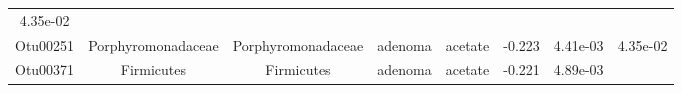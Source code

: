 \documentclass[11pt,]{article}
\begin{document}
\begin{longtable}[]{@{}cccccccc@{}}
\begin{minipage}[t]{0.08\columnwidth}
4.35e-02\strut
\end{minipage}\tabularnewline
\begin{minipage}[t]{0.08\columnwidth}\centering\strut
Otu00251\strut
\end{minipage} & \begin{minipage}[t]{0.15\columnwidth}\centering\strut
Porphyromonadaceae\strut
\end{minipage} & \begin{minipage}[t]{0.15\columnwidth}\centering\strut
Porphyromonadaceae\strut
\end{minipage} & \begin{minipage}[t]{0.08\columnwidth}\centering\strut
adenoma\strut
\end{minipage} & \begin{minipage}[t]{0.09\columnwidth}\centering\strut
acetate\strut
\end{minipage} & \begin{minipage}[t]{0.07\columnwidth}\centering\strut
-0.223\strut
\end{minipage} & \begin{minipage}[t]{0.08\columnwidth}\centering\strut
4.41e-03\strut
\end{minipage} & \begin{minipage}[t]{0.08\columnwidth}\centering\strut
4.35e-02\strut
\end{minipage}\tabularnewline
\begin{minipage}[t]{0.08\columnwidth}\centering\strut
Otu00371\strut
\end{minipage} & \begin{minipage}[t]{0.15\columnwidth}\centering\strut
Firmicutes\strut
\end{minipage} & \begin{minipage}[t]{0.15\columnwidth}\centering\strut
Firmicutes\strut
\end{minipage} & \begin{minipage}[t]{0.08\columnwidth}\centering\strut
adenoma\strut
\end{minipage} & \begin{minipage}[t]{0.09\columnwidth}\centering\strut
acetate\strut
\end{minipage} & \begin{minipage}[t]{0.07\columnwidth}\centering\strut
-0.221\strut
\end{minipage} & \begin{minipage}[t]{0.08\columnwidth}\centering\strut
4.89e-03\strut
\end{minipage} & \begin{minipage}[t]{0.08\columnwidth}\centering\strut

\end{minipage}
\end{longtable}
\end{document}
